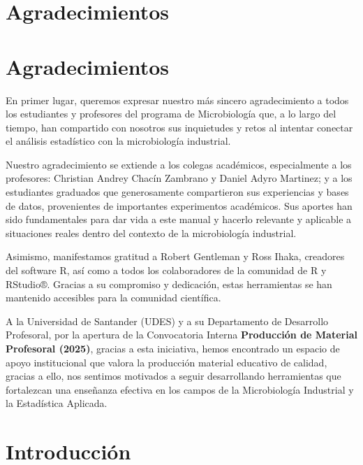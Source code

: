 \documentclass[
  spanish,
  letterpaper,
  DIV=11,
  numbers=noendperiod]{scrreprt}
\begin{document}

\chapter{Agradecimientos}\label{agradecimientos}


\chapter*{Agradecimientos}\label{agradecimientos-1}


En primer lugar, queremos expresar nuestro más sincero agradecimiento a
todos los estudiantes y profesores del programa de Microbiología que, a
lo largo del tiempo, han compartido con nosotros sus inquietudes y retos
al intentar conectar el análisis estadístico con la microbiología
industrial.

Nuestro agradecimiento se extiende a los colegas académicos,
especialmente a los profesores: Christian Andrey Chacín Zambrano y
Daniel Adyro Martinez; y a los estudiantes graduados que generosamente
compartieron sus experiencias y bases de datos, provenientes de
importantes experimentos académicos. Sus aportes han sido fundamentales
para dar vida a este manual y hacerlo relevante y aplicable a
situaciones reales dentro del contexto de la microbiología industrial.

Asimismo, manifestamos gratitud a Robert Gentleman y Ross Ihaka,
creadores del software R, así como a todos los colaboradores de la
comunidad de R y RStudio®. Gracias a su compromiso y dedicación, estas
herramientas se han mantenido accesibles para la comunidad científica.

A la Universidad de Santander (UDES) y a su Departamento de Desarrollo
Profesoral, por la apertura de la Convocatoria Interna
\textbf{Producción de Material Profesoral (2025)}, gracias a esta
iniciativa, hemos encontrado un espacio de apoyo institucional que
valora la producción material educativo de calidad, gracias a ello, nos
sentimos motivados a seguir desarrollando herramientas que fortalezcan
una enseñanza efectiva en los campos de la Microbiología Industrial y la
Estadística Aplicada.


\chapter{Introducción}\label{introducciuxf3n}
\end{document}

